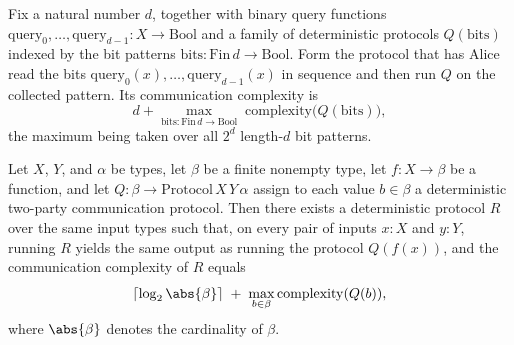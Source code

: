 \begin{theorem}
\label{CommunicationComplexity.Deterministic.FiniteMessage.Protocol.completeTreeAlice_complexity}
\leanok
{}
Fix a natural number $d$, together with binary query functions
$\mathrm{query}_0,\dots,\mathrm{query}_{d-1} : X \to \mathrm{Bool}$ and a family of
deterministic protocols $Q(\mathrm{bits})$ indexed by the bit patterns $\mathrm{bits} :
\mathrm{Fin}\,d \to \mathrm{Bool}$. Form the protocol that has Alice read the bits
$\mathrm{query}_0(x),\dots,\mathrm{query}_{d-1}(x)$ in sequence and then run $Q$ on the
collected pattern. Its communication complexity is
\[
d + \max_{\mathrm{bits} : \mathrm{Fin}\,d \to \mathrm{Bool}} \;
\mathrm{complexity}\bigl(Q(\mathrm{bits})\bigr),
\]
the maximum being taken over all $2^d$ length-$d$ bit patterns.
\end{theorem}

\begin{theorem}
\label{CommunicationComplexity.Deterministic.FiniteMessage.Protocol.encode_alice}
\leanok
{}
Let $X$, $Y$, and $\alpha$ be types, let $\beta$ be a finite nonempty type, let $f : X
\to \beta$ be a function, and let $Q : \beta \to \mathrm{Protocol}\,X\,Y\,\alpha$ assign
to each value $b \in \beta$ a deterministic two-party communication protocol. Then there
exists a deterministic protocol $R$ over the same input types such that, on every pair
of inputs $x : X$ and $y : Y$, running $R$ yields the same output as running the
protocol $Q(f(x))$, and the communication complexity of $R$ equals
\[
\lceil \log_2 \abs{\beta} \rceil \;+\; \max_{b \in \beta}
\operatorname{complexity}(Q(b)),
\]
where $\abs{\beta}$ denotes the cardinality of $\beta$.
\end{theorem}

